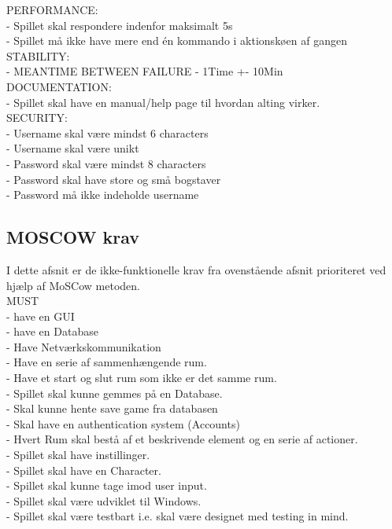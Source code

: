 PERFORMANCE:\\
    - Spillet skal respondere indenfor maksimalt 5s\\
    - Spillet må ikke have mere end én kommando i aktionskøen af gangen\\
  STABILITY:\\
    - MEANTIME BETWEEN FAILURE - 1Time +- 10Min\\
  DOCUMENTATION:\\
    - Spillet skal have en manual/help page til hvordan alting virker.\\
  SECURITY:\\
    - Username skal være mindst 6 characters\\
    - Username skal være unikt\\
    - Password skal være mindst 8 characters\\
    - Password skal have store og små bogstaver\\
    - Password må ikke indeholde username\\

\subsection{MOSCOW krav}
I dette afsnit er de ikke-funktionelle krav fra ovenstående afsnit prioriteret ved hjælp af MoSCow metoden.\\
MUST\\
  - have en GUI\\
  - have en Database\\
  - Have Netværkskommunikation\\
  - Have en serie af sammenhængende rum.\\
  - Have et start og slut rum som ikke er det samme rum.\\
  - Spillet skal kunne gemmes på en Database.\\
  - Skal kunne hente save game fra databasen\\
  - Skal have en authentication system (Accounts)\\
  - Hvert Rum skal bestå af et beskrivende element og en serie af actioner.\\
  - Spillet skal have instillinger.\\
  - Spillet skal have en Character.\\
  - Spillet skal kunne tage imod user input.\\
  - Spillet skal være udviklet til Windows.\\
  - Spillet skal være testbart i.e. skal være designet med testing in mind.\\

